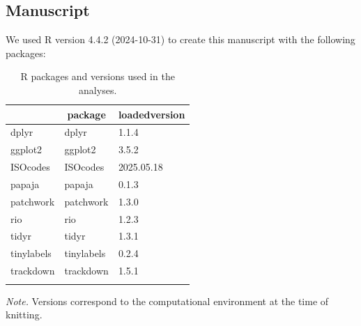 \documentclass[
  man]{apa6}
\begin{document}
\subsection{Manuscript}\label{manuscript}

We used R version 4.4.2 (2024-10-31) to create this manuscript with the following packages:

\begin{table}[H]

\begin{center}
\begin{threeparttable}

\caption{\label{tab:unnamed-chunk-11}R packages and versions used in the analyses.}

\begin{tabular}{lll}
\toprule
 & \multicolumn{1}{c}{package} & \multicolumn{1}{c}{loadedversion}\\
\midrule
dplyr & dplyr & 1.1.4\\
ggplot2 & ggplot2 & 3.5.2\\
ISOcodes & ISOcodes & 2025.05.18\\
papaja & papaja & 0.1.3\\
patchwork & patchwork & 1.3.0\\
rio & rio & 1.2.3\\
tidyr & tidyr & 1.3.1\\
tinylabels & tinylabels & 0.2.4\\
trackdown & trackdown & 1.5.1\\
\bottomrule
\addlinespace
\end{tabular}

\begin{tablenotes}[para]
\normalsize{\textit{Note.} Versions correspond to the computational environment at the time of knitting.}
\end{tablenotes}

\end{threeparttable}
\end{center}

\end{table}
\end{document}
